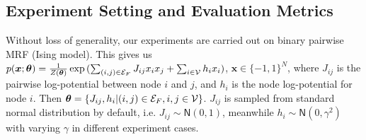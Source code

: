 \subsection{Experiment Setting and Evaluation Metrics}
\label{subsec:exp-setting}
Without loss of generality, our experiments are carried out on binary pairwise MRF (Ising model). This gives us $p(\bm{x}; \bm{\theta}) = \frac{1}{Z(\bm{\theta})}\exp{(\sum_{(i,j)\in \mathcal{E}_F} J_{ij} x_i x_j + \sum_{i\in \mathcal{V}}h_i x_i)}$, $\bm{x} \in \{-1, 1\}^{N}$, where $J_{ij}$ is the pairwise log-potential between node $i$ and $j$, and $h_i$ is the node log-potential for node $i$. Then $\bm{\theta} = \left\{ J_{ij}, h_i| (i,j) \in \mathcal{E}_F, i,j \in \mathcal{V} \right\}$. $J_{ij}$ is sampled from standard normal distribution by default, i.e. $J_{ij}\sim \mathsf{N}(0,1)$, meanwhile $h_i \sim \mathsf{N}(0, \gamma^{2})$ with varying $\gamma$ in different experiment cases.


